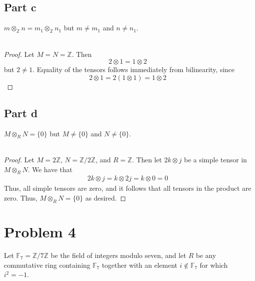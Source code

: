 \documentclass[12pt,reqno]{amsart}
\newcommand{\Z}{\mathbb{Z}}
\begin{document}
\subsection*{Part c}
$m\otimes_{\Z} n = m_1\otimes_{\Z}n_1$ but $m\neq m_1$ and $n\neq n_1$.
\\
\\
\begin{proof}
    Let $M=N=\Z$. Then
    \[
        2\otimes 1 = 1\otimes 2
    \]
    but $2\neq 1$. Equality of the tensors follows immediately from bilinearity,
    since
    \[
        2\otimes 1 = 2(1\otimes 1) = 1\otimes 2
    \]
\end{proof}

\subsection*{Part d}
$M\otimes_R N = \{0\}$ but $M\neq \{0\}$ and $N\neq\{0\}$.
\\
\\
\begin{proof}
    Let $M=2\Z$, $N=\Z/{2\Z}$, and $R=\Z$. Then let $2k\otimes j$ be a simple
    tensor in $M\otimes_R N$. We have that
    \[
\begin{aligned}
    2k\otimes j = k\otimes 2j = k\otimes 0 = 0
\end{aligned}
    \]
    Thus, all simple tensors are zero, and it follows that all tensors in the
    product are zero. Thus, $M\otimes_R N = \{0\}$ as desired.
\end{proof}

\newpage

\section*{Problem 4}
Let $\mathbb{F}_7 = \Z/{7\Z}$ be the field of integers modulo seven, and let $R$
be any commutative ring containing $\mathbb{F}_7$ together with an element
$i\not\in \mathbb{F}_7$ for which $i^2=-1$. 
\end{document}
